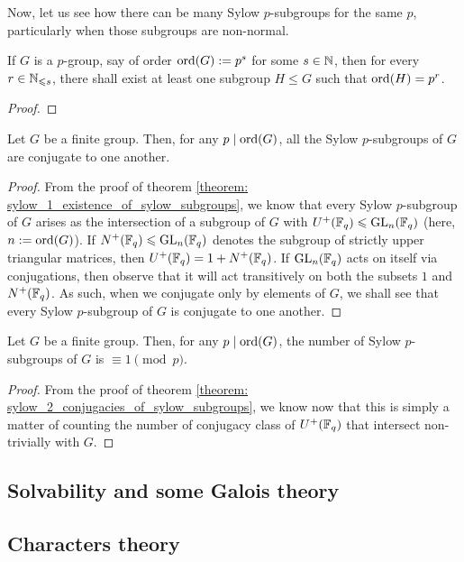         Now, let us see how there can be many Sylow $p$-subgroups for the same $p$, particularly when those subgroups are non-normal.
        \begin{lemma} \label{lemma: subgroups_of_p_groups}
            If $G$ is a $p$-group, say of order $\operatorname{ord}(G) := p^s$ for some $s \in \mathbb{N}$, then for every $r \in \mathbb{N}_{\leqslant s}$, there shall exist at least one subgroup $H \leq G$ such that $\operatorname{ord}(H) = p^r$.
        \end{lemma}
            \begin{proof}
                
            \end{proof}
        \begin{theorem} \label{theorem: sylow_2_conjugacies_of_sylow_subgroups}
            Let $G$ be a finite group. Then, for any $p \mid \operatorname{ord}(G)$, all the Sylow $p$-subgroups of $G$ are conjugate to one another. 
        \end{theorem}
            \begin{proof}
                From the proof of theorem \ref{theorem: sylow_1_existence_of_sylow_subgroups}, we know that every Sylow $p$-subgroup of $G$ arises as the intersection of a subgroup of $G$ with $U^+(\mathbb{F}_q) \leqslant \mathrm{GL}_n(\mathbb{F}_q)$ (here, $n := \operatorname{ord}(G)$). If $N^+(\mathbb{F}_q) \leqslant \mathrm{GL}_n(\mathbb{F}_q)$ denotes the subgroup of strictly upper triangular matrices, then $U^+(\mathbb{F}_q) = 1 + N^+(\mathbb{F}_q)$. If $\mathrm{GL}_n(\mathbb{F}_q)$ acts on itself via conjugations, then observe that it  will act transitively on both the subsets $1$ and $N^+(\mathbb{F}_q)$. As such, when we conjugate only by elements of $G$, we shall see that every Sylow $p$-subgroup of $G$ is conjugate to one another.
            \end{proof}

        \begin{theorem} \label{theorem: sylow_3_number_of_sylow_subgroups}
            Let $G$ be a finite group. Then, for any $p \mid \operatorname{ord}(G)$, the number of Sylow $p$-subgroups of $G$ is $\equiv 1 \pmod{p}$.
        \end{theorem}
            \begin{proof}
                From the proof of theorem \ref{theorem: sylow_2_conjugacies_of_sylow_subgroups}, we know now that this is simply a matter of counting the number of conjugacy class of $U^+(\mathbb{F}_q)$ that intersect non-trivially with $G$.
            \end{proof}

    \subsection{Solvability and some Galois theory}

    \subsection{Characters theory}